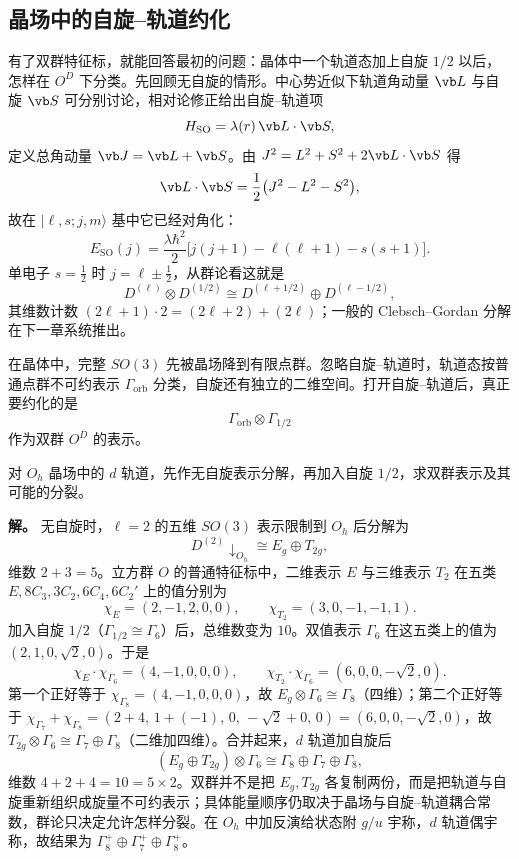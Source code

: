\subsection{晶场中的自旋--轨道约化}
\label{sec:crystal-spin-orbit}

有了双群特征标，就能回答最初的问题：晶体中一个轨道态加上自旋 $1/2$ 以后，怎样在 $O^D$ 下分类。先回顾无自旋的情形。中心势近似下轨道角动量 $\vb L$ 与自旋 $\vb S$ 可分别讨论，相对论修正给出自旋--轨道项
\begin{equation}
H_{\mathrm{SO}}=\lambda(r)\,\vb L\cdot\vb S,
\label{eq:spin-orbit-hamiltonian}
\end{equation}
定义总角动量 $\vb J=\vb L+\vb S$。由 $J^2=L^2+S^2+2\vb L\cdot\vb S$ 得
\begin{equation}
\vb L\cdot\vb S=\frac12\bigl(J^2-L^2-S^2\bigr),
\label{eq:LdotS}
\end{equation}
故在 $|\ell,s;j,m\rangle$ 基中它已经对角化：
\begin{equation}
E_{\mathrm{SO}}(j)
=\frac{\lambda\hbar^2}{2}\bigl[j(j+1)-\ell(\ell+1)-s(s+1)\bigr].
\label{eq:spin-orbit-energy}
\end{equation}
单电子 $s=\tfrac12$ 时 $j=\ell\pm\tfrac12$，从群论看这就是
\[
D^{(\ell)}\otimes D^{(1/2)}\cong D^{(\ell+1/2)}\oplus D^{(\ell-1/2)},
\]
其维数计数 $(2\ell+1)\cdot2=(2\ell+2)+(2\ell)$；一般的 Clebsch--Gordan 分解在下一章系统推出。

在晶体中，完整 $SO(3)$ 先被晶场降到有限点群。忽略自旋--轨道时，轨道态按普通点群不可约表示 $\Gamma_{\mathrm{orb}}$ 分类，自旋还有独立的二维空间。打开自旋--轨道后，真正要约化的是
\[
\Gamma_{\mathrm{orb}}\otimes\Gamma_{1/2}
\]
作为双群 $O^D$ 的表示。

\begin{example}
对 $O_h$ 晶场中的 $d$ 轨道，先作无自旋表示分解，再加入自旋 $1/2$，求双群表示及其可能的分裂。

\textbf{解。} 无自旋时，$\ell=2$ 的五维 $SO(3)$ 表示限制到 $O_h$ 后分解为
\[
D^{(2)}\downarrow_{O_h}\cong E_g\oplus T_{2g},
\]
维数 $2+3=5$。立方群 $O$ 的普通特征标中，二维表示 $E$ 与三维表示 $T_2$ 在五类 $E,8C_3,3C_2,6C_4,6C_2'$ 上的值分别为
\[
\chi_E=(2,-1,2,0,0),\qquad \chi_{T_2}=(3,0,-1,-1,1).
\]
加入自旋 $1/2$（$\Gamma_{1/2}\cong\Gamma_6$）后，总维数变为 $10$。双值表示 $\Gamma_6$ 在这五类上的值为 $(2,1,0,\sqrt2,0)$。于是
\[
\chi_E\cdot\chi_{\Gamma_6}=(4,-1,0,0,0),
\qquad
\chi_{T_2}\cdot\chi_{\Gamma_6}=(6,0,0,-\sqrt2,0).
\]
第一个正好等于 $\chi_{\Gamma_8}=(4,-1,0,0,0)$，故 $E_g\otimes\Gamma_6\cong\Gamma_8$（四维）；第二个正好等于 $\chi_{\Gamma_7}+\chi_{\Gamma_8}=(2+4,\,1+(-1),\,0,\,-\sqrt2+0,\,0)=(6,0,0,-\sqrt2,0)$，故 $T_{2g}\otimes\Gamma_6\cong\Gamma_7\oplus\Gamma_8$（二维加四维）。合并起来，$d$ 轨道加自旋后
\[
(E_g\oplus T_{2g})\otimes\Gamma_6\cong\Gamma_8\oplus\Gamma_7\oplus\Gamma_8,
\]
维数 $4+2+4=10=5\times2$。双群并不是把 $E_g,T_{2g}$ 各复制两份，而是把轨道与自旋重新组织成旋量不可约表示；具体能量顺序仍取决于晶场与自旋--轨道耦合常数，群论只决定允许怎样分裂。在 $O_h$ 中加反演给状态附 $g/u$ 宇称，$d$ 轨道偶宇称，故结果为 $\Gamma_8^+\oplus\Gamma_7^+\oplus\Gamma_8^+$。
\end{example}

